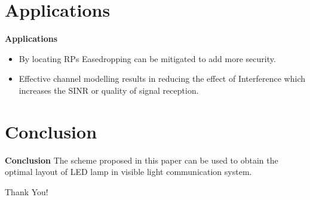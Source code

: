 \documentclass[9pt, dvipsnames]{beamer} %
\begin{document}
\section{Applications}
 
   \begin{frame}{\textbf {Applications}}  
          
        \begin{itemize}
            \item By locating RPs Easedropping can be mitigated to add more security.
            \item Effective channel modelling results in reducing the effect of Interference which increases the SINR or quality of signal reception.
        \end{itemize}
              
                
    \end{frame}
   
\section{Conclusion}
 
   \begin{frame}{\textbf {Conclusion}}  
        The scheme proposed in this paper can be used to obtain the optimal layout of LED lamp in visible light communication system.
              
                
    \end{frame}
    \begin{frame}%
          \begin{center}
             {\fontsize{40}{50}\selectfont Thank You!}
          \end{center}
     \end{frame}
    
\end{document}

